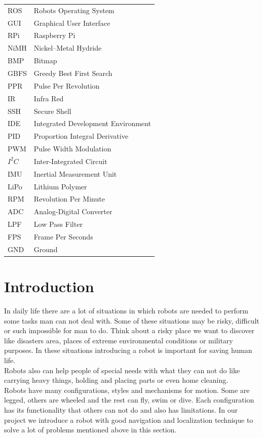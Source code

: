 \documentclass[12pt]{article}
\begin{document}
\begin{tabular}{  l    l   }
	ROS & Robots Operating System	\\
	GUI & Graphical User Interface	\\
	RPi &   Raspberry Pi	\\
	NiMH & Nickel–Metal Hydride\\
	BMP & Bitmap \\
	GBFS & Greedy Best First Search\\
	PPR & Pulse Per Revolution \\
	IR & Infra Red \\
	SSH & Secure Shell\\
	IDE & Integrated Development Environment\\
	
	PID & Proportion Integral Derivative  \\  
	PWM &  Pulse Width Modulation  \\   
	$I^2C$  & Inter-Integrated Circuit   \\  
	IMU &  Inertial Measurement Unit \\  
	LiPo &   Lithium Polymer\\ 
	RPM   & Revolution Per Minute  \\
	ADC   & Analog-Digital Converter   \\  
	LPF & Low Pass Filter \\
	FPS & Frame Per Seconds\\
	GND & Ground
	
\end{tabular} 




\newpage

\renewcommand{\headrulewidth}{.5pt}

\listoffigures
\thispagestyle{empty}
\newpage
{}
\setcounter{page}{1}


\section{Introduction}
 In daily life there are a lot of situations in which robots are needed to perform some tasks man can not deal with. Some of these situations may be risky, difficult or such impossible for man to do. Think about a risky place we want to discover like disasters area, places of extreme environmental conditions or military purposes. In these situations introducing a robot is important for saving human life.\\
 Robots also can help people of special needs with what they can not do like carrying heavy things, holding and placing parts or even home cleaning.\\
 Robots have many configurations, styles and mechanisms for motion. Some are legged, others are wheeled and the rest can fly, swim or dive. Each configuration has its functionality that others can not do and also has limitations.
 In our project we introduce a robot with good navigation and localization technique to solve a lot of problems mentioned above in this section. 
\end{document}
